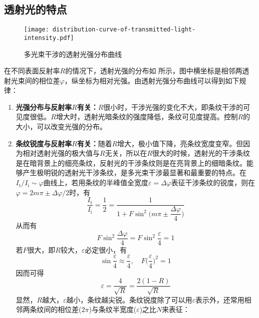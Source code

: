\documentclass[cn,10pt,chinesefont=founder,math=mtpro2,cite=super,toc=onecol,twoside]{elegantbook}
\begin{document}
\subsection{透射光的特点}
\begin{figure}[htbp]
	\centering
	\texttt{[image: distribution-curve-of-transmitted-light-intensity.pdf]}
	\caption{多光束干涉的透射光强分布曲线}
	\label{fig:distribution-curve-of-transmitted-light-intensity}
\end{figure}
在不同表面反射率$R$的情况下，透射光强的分布如 所示，图中横坐标是相邻两透射光束间的相位差$\varphi$，纵坐标为相对光强。由透射光强分布曲线可以得到如下规律：
\begin{enumerate}
	\item \textbf{光强分布与反射率$R$有关：}$R$很小时，干涉光强的变化不大，即条纹干涉的可见度很低。$R$增大时，透射光暗条纹的强度降低，条纹可见度提高。控制$R$的大小，可以改变光强的分布。
	\item \textbf{条纹锐度与反射率$R$有关：}随着$R$增大，极小值下降，亮条纹宽度变窄。但因为相对透射光强的极大值与$R$无关，所以在$R$很大的时候，透射光的干涉条纹是在暗背景上的细亮条纹，反射光的干涉条纹则是在亮背景上的细暗条纹。能够产生极明锐的透射光干涉条纹，是多光束干涉最显著和最重要的特点。在$I_{\mathrm{t}}/I_{\mathrm{i}}\sim\varphi$曲线上，若用条纹的半峰值全宽度$\varepsilon=\Delta\varphi$表征干涉条纹的锐度，则在$\varphi=2m\pi\pm\Delta\varphi/2$时，有
	\begin{equation}
	\frac{I_{\mathrm{t}}}{I_{\mathrm{i}}}=\frac{1}{2}=\frac{1}{1+F\sin^2\bigg(m\pi\pm\dfrac{\Delta\varphi}{4}\bigg)}
	\end{equation}
	从而有
	\begin{equation}
	F\sin^2\frac{\Delta\varphi}{4}=F\sin^2\frac{\varepsilon}{4}=1
	\end{equation}
	若$F$很大，即$R$较大，$\varepsilon$必定很小，有
	\begin{equation}
	\sin\frac{\varepsilon}{4}\approx\frac{\varepsilon}{4},\quad F\bigg(\frac{\varepsilon}{4}\bigg)^2=1
	\end{equation}
	因而可得
	\begin{equation}
	\varepsilon=\frac{4}{\sqrt{R}}=\frac{2(1-R)}{\sqrt{R}}
	\label{eq:relationship-between-half-width-and-reflectivity}
	\end{equation}
	显然，$R$越大，$\varepsilon$越小，条纹越尖锐。条纹锐度除了可以用$\varepsilon$表示外，还常用相邻两条纹间的相位差($2\pi$)与条纹半宽度($\varepsilon$)之比$N$来表征：
	\begin{equation}

\end{equation}
\end{enumerate}
\end{document}
